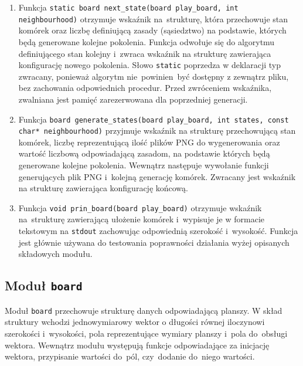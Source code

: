 \documentclass[a4paper,11pt]{article}
\begin{document}
\begin{enumerate}
					
					\item Funkcja \texttt{static board next\_state(board play\_board, int neighbourhood)} otrzymuje wskaźnik na~strukturę, która przechowuje stan komórek  oraz liczbę definiującą zasady (sąsiedztwo) na podstawie, których będą generowane kolejne pokolenia. Funkcja odwołuje się do algorytmu definiującego stan kolejny i~zwraca wskaźnik na strukturę zawierająca konfigurację nowego pokolenia. Słowo \texttt{static} poprzedza w deklaracji typ zwracany, ponieważ algorytm nie~powinien~być dostępny z zewnątrz pliku, bez zachowania odpowiednich procedur. Przed zwróceniem wskaźnika, zwalniana jest pamięć zarezerwowana dla poprzedniej generacji.
					\item Funkcja \texttt{board generate\_states(board play\_board, int states, const char* neighbourhood)}   przyjmuje wskaźnik na strukturę przechowującą stan komórek, liczbę reprezentującą ilość plików PNG do wygenerowania oraz wartość liczbową odpowiadającą zasadom, na podstawie których będą generowane kolejne pokolenia. Wewnątrz następuje wywołanie funkcji generujących plik PNG i~kolejną generację komórek. Zwracany jest wskaźnik na strukturę zawierająca konfigurację końcową.
					\item Funkcja \texttt{void prin\_board(board play\_board)} otrzymuje wskaźnik na~strukturę zawierającą ułożenie komórek i~wypisuje je w formacie tekstowym na \texttt{stdout} zachowując odpowiednią szerokość i~wysokość. Funkcja jest głównie używana do testowania poprawności działania wyżej opisanych składowych modułu.
					
				\end{enumerate} 
			\subsection{Moduł \texttt{board}}
				Moduł \texttt{board} przechowuje strukturę danych odpowiadającą planszy. W skład struktury wchodzi jednowymiarowy wektor o długości równej iloczynowi szerokości i~wysokości, pola reprezentujące wymiary planszy i~pola do~obsługi wektora. Wewnątrz modułu występują funkcje odpowiadające za inicjację wektora, przypisanie wartości do~pól, czy~dodanie do~niego wartości.
\end{document}
